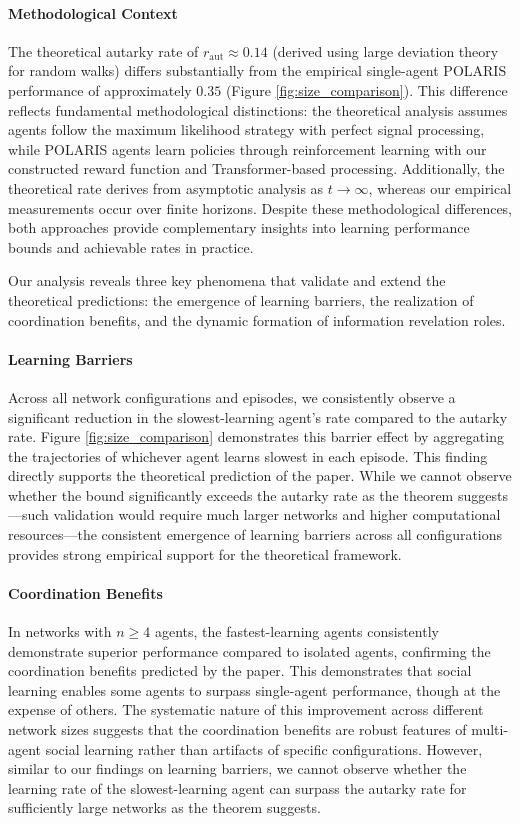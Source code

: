 \paragraph{Methodological Context} The theoretical autarky rate of $r_{\text{aut}} \approx 0.14$ (derived using large deviation theory for random walks) differs substantially from the empirical single-agent POLARIS performance of approximately $0.35$ (Figure \ref{fig:size_comparison}). This difference reflects fundamental methodological distinctions: the theoretical analysis assumes agents follow the maximum likelihood strategy with perfect signal processing, while POLARIS agents learn policies through reinforcement learning with our constructed reward function and Transformer-based processing. Additionally, the theoretical rate derives from asymptotic analysis as $t \to \infty$, whereas our empirical measurements occur over finite horizons. Despite these methodological differences, both approaches provide complementary insights into learning performance bounds and achievable rates in practice.
\fi

Our analysis reveals three key phenomena that validate and extend the theoretical predictions: the emergence of learning barriers, the realization of coordination benefits, and the dynamic formation of information revelation roles.


\paragraph{Learning Barriers} Across all network configurations and episodes, we consistently observe a significant reduction in the slowest-learning agent's rate compared to the autarky rate. Figure \ref{fig:size_comparison} demonstrates this barrier effect by aggregating the trajectories of whichever agent learns slowest in each episode. This finding directly supports the theoretical prediction of the paper. While we cannot observe whether the bound significantly exceeds the autarky rate as the theorem suggests—such validation would require much larger networks and higher computational resources—the consistent emergence of learning barriers across all configurations provides strong empirical support for the theoretical framework.

\paragraph{Coordination Benefits} In networks with $n \geq 4$ agents, the fastest-learning agents consistently demonstrate superior performance compared to isolated agents, confirming the coordination benefits predicted by the paper. This demonstrates that social learning enables some agents to surpass single-agent performance, though at the expense of others. The systematic nature of this improvement across different network sizes suggests that the coordination benefits are robust features of multi-agent social learning rather than artifacts of specific configurations. However, similar to our findings on learning barriers, we cannot observe whether the learning rate of the slowest-learning agent can surpass the autarky rate for sufficiently large networks as the theorem suggests.

